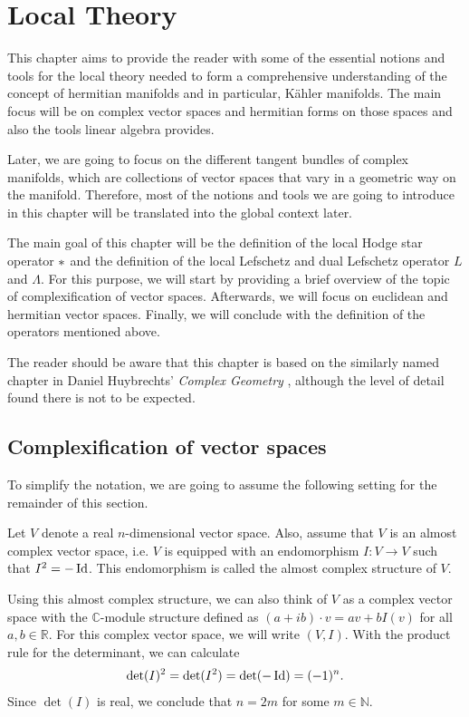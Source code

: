 \section{Local Theory}
This chapter aims to provide the reader with some of the essential notions and tools for the local
theory needed to form a comprehensive understanding of the concept of hermitian manifolds and 
in particular, Kähler manifolds. The main focus will be on complex vector spaces and hermitian 
forms on those spaces and also the tools linear algebra provides.

Later, we are going to focus on the different tangent bundles of complex manifolds, which are
collections of vector spaces that vary in a geometric way on the manifold. Therefore, most of the 
notions and tools we are going to introduce in this chapter will be translated into the global 
context later.

The main goal of this chapter will be the definition of the local Hodge star operator \nolinebreak
$\operatorname{\ast}$ and the definition of the local Lefschetz and dual Lefschetz operator $L$ and 
$\Lambda$. For this purpose, we will start by providing a brief overview of the topic of 
complexification of vector spaces. Afterwards, we will focus on euclidean and hermitian vector 
spaces. Finally, we will conclude with the definition of the operators mentioned above.

The reader should be aware that this chapter is based on the similarly named chapter in Daniel
Huybrechts' \emph{Complex Geometry} \cite{Huybrechts2004}, although the level of detail found there
is not to be expected.

\subsection{Complexification of vector spaces}\;

To simplify the notation, we are going to assume the following setting for the remainder of this
section.
\begin{set}
	Let $V$ denote a real $n$-dimensional vector space. Also, assume that $V$ is an almost complex
	vector space, i.e. $V$ is equipped with an 
	endomorphism $I: V\rightarrow V$ such that $I^2 = -\operatorname{Id}$. This endomorphism is called the almost
	complex structure of $V$.
\end{set}

Using this almost complex structure, we can also think of $V$ as a complex vector space with the
$\mathbb{C}$-module structure defined as $(a+ib)\cdot v = a v + b I(v)$ for all $a,b \in
\mathbb{R}$. For this complex vector space, we will write $(V,I)$. With the product rule for the
determinant, we can calculate
\begin{align*}
	\det(I)^2 = \det(I^2) = \det(-\operatorname{Id}) = (-1)^n.
\end{align*}
Since $\det(I)$ is real, we conclude that $n = 2m$ for some $m \in \mathbb{N}$.

